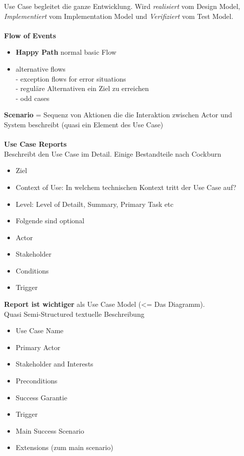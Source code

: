 Use Case begleitet die ganze Entwicklung. Wird \textit{realisiert} vom Design Model, \textit{Implementiert} vom Implementation Model und \textit{Verifiziert} vom Test Model.\\
\\
\textbf{Flow of Events}
\begin{itemize}
	\item \textbf{Happy Path} normal basic Flow
	\item alternative flows\\
	- exception flows for error situations\\
	- reguläre Alternativen ein Ziel zu erreichen\\
	- odd cases
\end{itemize}
\textbf{Scenario} = Sequenz von Aktionen die die Interaktion zwischen Actor und System beschreibt (quasi ein Element des Use Case)\\
\\
\textbf{Use Case Reports}\\
Beschreibt den Use Case im Detail. Einige Bestandteile nach Cockburn
\begin{itemize}
	\item Ziel
	\item Context of Use:  In welchem technischen Kontext tritt der Use Case auf?
	\item Level: Level of Detailt, Summary, Primary Task etc
	\item Folgende sind optional
	\item Actor
	\item Stakeholder
	\item Conditions
	\item Trigger
\end{itemize}
\textbf{Report ist wichtiger} als Use Case Model (<= Das Diagramm).
\\
Quasi Semi-Structured textuelle Beschreibung
\begin{itemize}
	\item Use Case Name
	\item Primary Actor
	\item Stakeholder and Interests
	\item Preconditions
	\item Success Garantie
	\item Trigger
	\item Main Success Scenario
	\item Extensions (zum main scenario)
\end{itemize}


